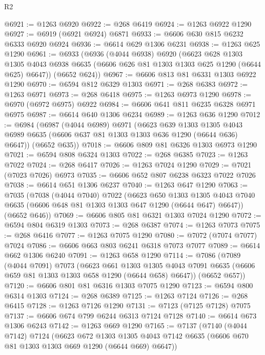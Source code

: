 \begin{lexlean}{R2}
\begin{coremodule}
@6921 := @1263 @6920
@6922 := @268 @6419
@6924 := @1263 @6922 @1290
@6927 := @6919 (@6921 @6924) @6871
@6933 := @6606 @630 @815 @6232 @6333 @6920 @6924
@6936 := @6614 @629 @1306 @6231
@6938 := @1263 @625 @1290
@6961 := @6933
    (@6936
      (@4044 @6938)
      @6920
      (@6623
        @628
        @1303
        @1305
        @4043
        @6938
        @6635
        (@6606 @626 @81 @1303 @1303 @625 @1290 (@6644 @625) @6647))
      (@6652 @624))
@6967 := @6606 @813 @81 @6331 @1303 @6922 @1290
@6970 := @6594 @812 @6329 @1303
@6971 := @268 @6383
@6972 := @1263 @6971
@6973 := @268 @6418
@6975 := @1263 @6973 @1290
@6978 := @6970 (@6972 @6975) @6922
@6984 := @6606 @641 @811 @6235 @6328 @6971 @6975
@6987 := @6614 @640 @1306 @6234
@6989 := @1263 @636 @1290
@7012 := @6984
    (@6987
      (@4044 @6989)
      @6971
      (@6623
        @639
        @1303
        @1305
        @4043
        @6989
        @6635
        (@6606 @637 @81 @1303 @1303 @636 @1290 (@6644 @636) @6647))
      (@6652 @635))
@7018 := @6606 @809 @81 @6326 @1303 @6973 @1290
@7021 := @6594 @808 @6324 @1303
@7022 := @268 @6385
@7023 := @1263 @7022
@7024 := @268 @6417
@7026 := @1263 @7024 @1290
@7029 := @7021 (@7023 @7026) @6973
@7035 := @6606 @652 @807 @6238 @6323 @7022 @7026
@7038 := @6614 @651 @1306 @6237
@7040 := @1263 @647 @1290
@7063 := @7035
    (@7038
      (@4044 @7040)
      @7022
      (@6623
        @650
        @1303
        @1305
        @4043
        @7040
        @6635
        (@6606 @648 @81 @1303 @1303 @647 @1290 (@6644 @647) @6647))
      (@6652 @646))
@7069 := @6606 @805 @81 @6321 @1303 @7024 @1290
@7072 := @6594 @804 @6319 @1303
@7073 := @268 @6387
@7074 := @1263 @7073
@7075 := @268 @6416
@7077 := @1263 @7075 @1290
@7080 := @7072 (@7074 @7077) @7024
@7086 := @6606 @663 @803 @6241 @6318 @7073 @7077
@7089 := @6614 @662 @1306 @6240
@7091 := @1263 @658 @1290
@7114 := @7086
    (@7089
      (@4044 @7091)
      @7073
      (@6623
        @661
        @1303
        @1305
        @4043
        @7091
        @6635
        (@6606 @659 @81 @1303 @1303 @658 @1290 (@6644 @658) @6647))
      (@6652 @657))
@7120 := @6606 @801 @81 @6316 @1303 @7075 @1290
@7123 := @6594 @800 @6314 @1303
@7124 := @268 @6389
@7125 := @1263 @7124
@7126 := @268 @6415
@7128 := @1263 @7126 @1290
@7131 := @7123 (@7125 @7128) @7075
@7137 := @6606 @674 @799 @6244 @6313 @7124 @7128
@7140 := @6614 @673 @1306 @6243
@7142 := @1263 @669 @1290
@7165 := @7137
    (@7140
      (@4044 @7142)
      @7124
      (@6623
        @672
        @1303
        @1305
        @4043
        @7142
        @6635
        (@6606 @670 @81 @1303 @1303 @669 @1290 (@6644 @669) @6647))

\end{coremodule}
\end{lexlean}
